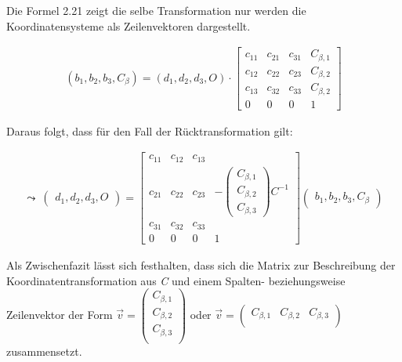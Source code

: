 	
	
	
%	
	
	Die Formel 2.21 zeigt die selbe Transformation nur werden die Koordinatensysteme als Zeilenvektoren dargestellt.

	\begin{gather}
	(b_1, b_2, b_3, C_\beta) = (d_1,d_2, d_3, O) \cdot
	\begin{bmatrix} 
	c_{11} & c_{21} & c_{31} & C_{\beta,1}\\
	c_{12} & c_{22} & c_{23} & C_{\beta,2}\\
	c_{13} & c_{32} & c_{33} & C_{\beta,2}\\
	0           &       0       &   0         & 1   
	\end{bmatrix}
	\end{gather}	
	
	Daraus folgt, dass für den Fall der Rücktransformation gilt:
	
	\begin{gather}
	\leadsto \: \begin{pmatrix}
	d_1,d_2,d_3,O
	\end{pmatrix} = 
	\begin{bmatrix}
	c_{11} & c_{12} & c_{13} & \\
	c_{21} & c_{22} & c_{23} &  -\begin{pmatrix}
C_{\beta,1}\\
C_{\beta,2}\\
C_{\beta,3}
	\end{pmatrix}C^{-1}\\
	c_{31} & c_{32} & c_{33} & \\
	0&0&0 & 1
	\end{bmatrix}
	\begin{pmatrix}
	b_1,b_2,b_3,C_\beta
	\end{pmatrix}
	\end{gather}
	
 Als Zwischenfazit lässt sich festhalten, dass sich die Matrix zur Beschreibung der Koordinatentransformation aus \textit{C} und einem Spalten- beziehungsweise Zeilenvektor der Form  \ensuremath{\vec{v}=\begin{pmatrix}
		C_{\beta,1}\\C_{\beta,2}\\C_{\beta,3}\\
	\end{pmatrix}} oder \ensuremath{\vec{v}=\begin{pmatrix}
	C_{\beta,1}&C_{\beta,2}&C_{\beta,3}\\
\end{pmatrix}} zusammensetzt.

